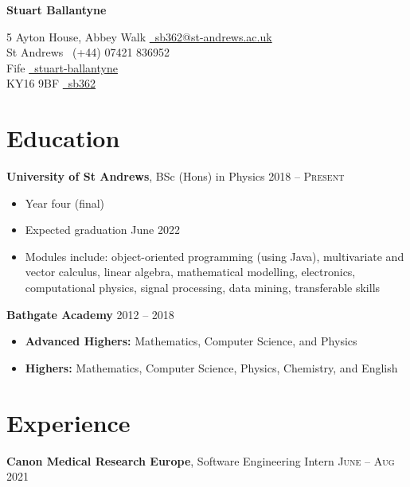 \documentclass{article}
\begin{document}
	
	\begin{center}
		\par{{\Large \textbf{Stuart Ballantyne}}\par}
	\end{center}
	
	\begin{center}
		5 Ayton House, Abbey Walk \hfill \href{mailto:sb362@st-andrews.ac.uk}{\faEnvelope\ sb362@st-andrews.ac.uk}\\
		St Andrews \hfill \faMobile\ (+44) 07421 836952\\
		Fife \hfill \href{https://www.linkedin.com/in/stuart-ballantyne/}{\faLinkedin\ stuart-ballantyne}\\
		KY16 9BF \hfill \href{https://github.com/sb362}{\faGithub\ sb362}
	\end{center}
	
	\section*{Education}
		\textbf{University of St Andrews}, BSc (Hons) in Physics \hfill \textsc{2018 -- Present}
		\begin{itemize}
			\item Year four (final)
			\item Expected graduation June 2022
			\item Modules include: object-oriented programming (using Java), multivariate and vector calculus, linear algebra, mathematical modelling, electronics, computational physics, signal processing, data mining, transferable skills
		\end{itemize}
		\textbf{Bathgate Academy} \hfill \textsc{2012 -- 2018}
		\begin{itemize}
			\item \textbf{Advanced Highers:} Mathematics, Computer Science, and Physics
			\item \textbf{Highers:} Mathematics, Computer Science, Physics, Chemistry, and English
		\end{itemize}	
	\setlist{}
	
	\section*{Experience}
		\textbf{Canon Medical Research Europe}, Software Engineering Intern \hfill \textsc{June -- Aug 2021}
		
\end{document}
